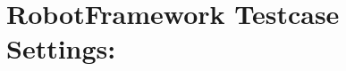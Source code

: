 



\hypertarget{description-robotframework-testcase-settings}{%
\section{RobotFramework Testcase
Settings:}\label{description-robotframework-testcase-settings}}

